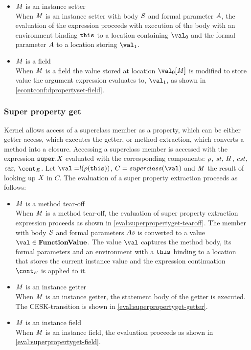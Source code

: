 \documentclass[a4paper,oneside]{article}
\begin{document}
\begin{itemize}
    \item $\mathit{M}$ is an instance setter\\
        When $\mathit{M}$ is an instance setter with body $\mathit{S}$ and formal parameter $A$, the evaluation of the expression proceeds with execution of the body with an environment binding $\tt{this}$ to a location containing $\val_0$ and the formal parameter $A$ to a location storing $\val_1$.

    \item $\mathit{M}$ is a field\\
        When $\mathit{M}$ is a field the value stored at location $\val_0[\membermeta]$ is modified to store value the argument expression evaluates to, $\val_1$, as shown in \eqref{econtconf:dpropertyset-field}.

\end{itemize}


\subsubsection{Super property get}
\label{subsubsec:super-property-get}

Kernel allows access of a superclass member as a property, which can be either getter access, which executes the getter, or method extraction, which converts a method into a closure.
Accessing a superclass member is accessed with the expression $\tt{super}.\mathit{X}$ evaluated with the corresponding components: $\rho$, $\textit{st}$, $\mathit{H}$, $\textit{cst}$, $\textit{cex}$, $\econt$.
Let $\val = \deref{(\env(\this))}$, $C = \superclass{\val}$ and $\mathit{M}$ the result of looking up $\mathit{X}$ in $C$.
The evaluation of a super property extraction proceeds as follows:

\begin{itemize}
    \item $\mathit{M}$ is a method tear-off\\
        When $\mathit{M}$ is a method tear-off, the evaluation of super property extraction expression proceeds as shown in \eqref{eval:superpropertyget-tearoff}.
        The member with body $\mathit{S}$ and formal parameters $As$ is converted to a value $\val \in \dfunval$.
        The value $\val$ captures the method body, its formal parameters and an environment with a $\tt{this}$ binding to a location that stores the current instance value and the expression continuation $\econt$ is applied to it.

    \item $\mathit{M}$ is an instance getter\\
        When $\mathit{M}$ is an instance getter, the statement body of the getter is executed.
        The CESK-transition is shown in \eqref{eval:superpropertyget-getter}.

    \item $\mathit{M}$ is an instance field\\
        When $\mathit{M}$ is an instance field, the evaluation proceeds as shown in \eqref{eval:superpropertyget-field}.

\end{itemize}
\end{document}
